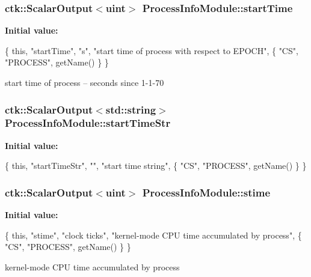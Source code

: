 \subsubsection[{\texorpdfstring{start\+Time}{startTime}}]{\setlength{\rightskip}{0pt plus 5cm}ctk\+::\+Scalar\+Output$<$uint$>$ Process\+Info\+Module\+::start\+Time}\hypertarget{structProcessInfoModule_a63fa6f3d052df587ee88136d260f85aa}{}\label{structProcessInfoModule_a63fa6f3d052df587ee88136d260f85aa}
{\bfseries Initial value\+:}
\begin{DoxyCode}
\{ \textcolor{keyword}{this}, \textcolor{stringliteral}{"startTime"}, \textcolor{stringliteral}{"s"}, \textcolor{stringliteral}{"start time of process with respect to EPOCH"},
    \{ \textcolor{stringliteral}{"CS"}, \textcolor{stringliteral}{"PROCESS"}, getName() \} \}
\end{DoxyCode}
start time of process -- seconds since 1-\/1-\/70 
\subsubsection[{\texorpdfstring{start\+Time\+Str}{startTimeStr}}]{\setlength{\rightskip}{0pt plus 5cm}ctk\+::\+Scalar\+Output$<$std\+::string$>$ Process\+Info\+Module\+::start\+Time\+Str}\hypertarget{structProcessInfoModule_a9e077650b12f3f7c7a0af1c304c1b8dd}{}\label{structProcessInfoModule_a9e077650b12f3f7c7a0af1c304c1b8dd}
{\bfseries Initial value\+:}
\begin{DoxyCode}
\{ \textcolor{keyword}{this}, \textcolor{stringliteral}{"startTimeStr"}, \textcolor{stringliteral}{""}, \textcolor{stringliteral}{"start time string"},
      \{ \textcolor{stringliteral}{"CS"}, \textcolor{stringliteral}{"PROCESS"}, getName() \} \}
\end{DoxyCode}
\subsubsection[{\texorpdfstring{stime}{stime}}]{\setlength{\rightskip}{0pt plus 5cm}ctk\+::\+Scalar\+Output$<$uint$>$ Process\+Info\+Module\+::stime}\hypertarget{structProcessInfoModule_a568d95f9a110c5db3171d49acfedf9be}{}\label{structProcessInfoModule_a568d95f9a110c5db3171d49acfedf9be}
{\bfseries Initial value\+:}
\begin{DoxyCode}
\{ \textcolor{keyword}{this}, \textcolor{stringliteral}{"stime"}, \textcolor{stringliteral}{"clock ticks"}, \textcolor{stringliteral}{"kernel-mode CPU time accumulated by process"},
    \{ \textcolor{stringliteral}{"CS"}, \textcolor{stringliteral}{"PROCESS"}, getName() \} \}
\end{DoxyCode}
kernel-\/mode C\+PU time accumulated by process 
